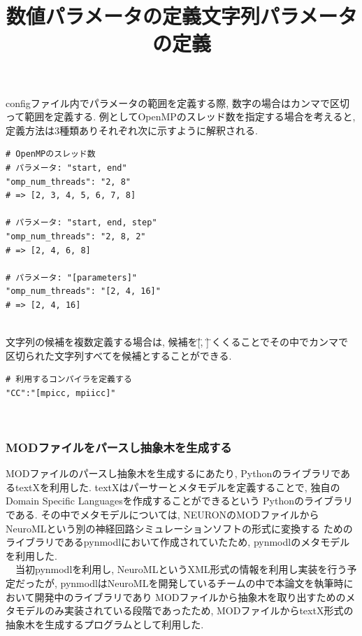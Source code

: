 \clearpage
configファイル内でパラメータの範囲を定義する際, 数字の場合はカンマで区切って範囲を定義する.
例としてOpenMPのスレッド数を指定する場合を考えると, 定義方法は3種類ありそれぞれ次に示すように解釈される.\\
\begin{table}[htb]
  \begin{center}
    \title{数値パラメータの定義}
{\footnotesize
\begin{framed}
\begin{verbatim}
# OpenMPのスレッド数
# パラメータ: "start, end"
"omp_num_threads": "2, 8"
# => [2, 3, 4, 5, 6, 7, 8]

# パラメータ: "start, end, step"
"omp_num_threads": "2, 8, 2"
# => [2, 4, 6, 8]

# パラメータ: "[parameters]"
"omp_num_threads": "[2, 4, 16]"
# => [2, 4, 16]
\end{verbatim}
\end{framed}
}
\end{center}
\end{table}~\\

文字列の候補を複数定義する場合は,
候補を\"[\", \"]\"でくくることでその中でカンマで区切られた文字列すべてを候補とすることができる.
\begin{table}[htb]
  \begin{center}
  \title {文字列パラメータの定義}
{\footnotesize
\begin{framed}
\begin{verbatim}
# 利用するコンパイラを定義する
"CC":"[mpicc, mpiicc]"
\end{verbatim}
\end{framed}
}
\end{center}
\end{table}~\\

\subsubsection{MODファイルをパースし抽象木を生成する}
\label{sec:simulator-mod-parse}
MODファイルのパースし抽象木を生成するにあたり, PythonのライブラリであるtextX\cite{textX-repo}を利用した. textXはパーサーとメタモデルを定義することで, 独自のDomain Specific Languagesを作成することができるという
Pythonのライブラリである.
その中でメタモデルについては, NEURONのMODファイルからNeuroMLという別の神経回路シミュレーションソフトの形式に変換する
ためのライブラリであるpynmodl\cite{pynmodl-repo}において作成されていたため, pynmodlのメタモデルを利用した.\\
　当初pynmodlを利用し, NeuroMLというXML形式の情報を利用し実装を行う予定だったが,
pynmodlはNeuroMLを開発しているチームの中で本論文を執筆時において開発中のライブラリであり
MODファイルから抽象木を取り出すためのメタモデルのみ実装されている段階であったため,
MODファイルからtextX形式の抽象木を生成するプログラムとして利用した.\\

